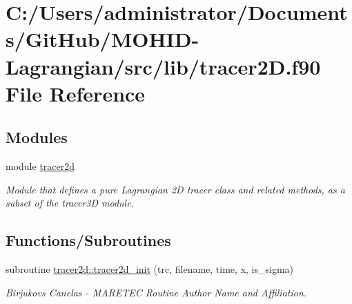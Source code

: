 \hypertarget{tracer2_d_8f90}{}\section{C\+:/\+Users/administrator/\+Documents/\+Git\+Hub/\+M\+O\+H\+I\+D-\/\+Lagrangian/src/lib/tracer2D.f90 File Reference}
\label{tracer2_d_8f90}
\subsection*{Modules}
\begin{DoxyCompactItemize}
\item 
module \mbox{\hyperlink{namespacetracer2d}{tracer2d}}
\begin{DoxyCompactList}\small\item\em Module that defines a pure Lagrangian 2D tracer class and related methods, as a subset of the tracer3D module. \end{DoxyCompactList}\end{DoxyCompactItemize}
\subsection*{Functions/\+Subroutines}
\begin{DoxyCompactItemize}
\item 
subroutine \mbox{\hyperlink{namespacetracer2d_abebf96ac23ed37832000c68fea45f584}{tracer2d\+::tracer2d\+\_\+init}} (trc, filename, time, x, is\+\_\+sigma)
\begin{DoxyCompactList}\small\item\em Birjukovs Canelas -\/ M\+A\+R\+E\+T\+EC Routine Author Name and Affiliation. \end{DoxyCompactList}\end{DoxyCompactItemize}
